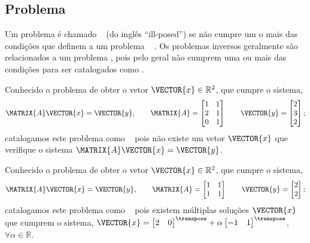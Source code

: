 \subsection{Problema \illposed}
\begin{definition}
\label{def:mal-posto:1}
Um problema é chamado \illposed~ (do inglês ``ill-posed'') se não cumpre um o 
mais das condições que definem a um problema 
\wellposed~ \cite[pp. 18]{gockenbach2016linear}.
Os problemas inversos geralmente são relacionados a um problema \illposed,
pois pelo geral não cumprem uma ou mais das condições para ser catalogados como \wellposed. 
\end{definition}

\begin{example}
\label{ex:IllPosedNoSolutions}
Conhecido o problema de obter o vetor $\VECTOR{x}\in \mathbb{R}^2$,
que cumpre o sistema,
\begin{equation}
\MATRIX{A}\VECTOR{x}=\VECTOR{y},
\qquad
\MATRIX{A}=
\begin{bmatrix}
1 & 1\\
2 & 1\\
0 & 1
\end{bmatrix}
\qquad
\VECTOR{y}=
\begin{bmatrix}
2\\
3\\
2
\end{bmatrix};
\end{equation}
catalogamos este problema como \illposed~ pois não existe um vetor $\VECTOR{x}$
que verifique o sistema $\MATRIX{A}\VECTOR{x}=\VECTOR{y}$.
\end{example}


\begin{example}
\label{ex:IllPosedMultiplaSolutions}
Conhecido o problema de obter o vetor $\VECTOR{x}\in \mathbb{R}^2$,
que cumpre o sistema,
\begin{equation}
\MATRIX{A}\VECTOR{x}=\VECTOR{y},
\qquad
\MATRIX{A}=
\begin{bmatrix}
1 & 1\\
1 & 1%
\end{bmatrix}
\qquad
\VECTOR{y}=
\begin{bmatrix}
2\\
2%
\end{bmatrix};
\end{equation}
catalogamos este problema como \illposed~  pois existem múltiplas soluções $\VECTOR{x}$
que cumprem o sistema,
$
\VECTOR{x}=
\begin{bmatrix}
2 & 0
\end{bmatrix}^{\transpose}
+\alpha
\begin{bmatrix}
-1 & 1
\end{bmatrix} ^{\transpose}$,
$ \forall \alpha \in \mathbb{R}$.
\end{example}

